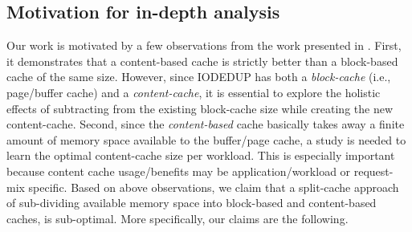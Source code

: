\subsection{Motivation for in-depth analysis}
Our work is motivated by a few observations from the work
presented in \cite{iodedup}.
First, it demonstrates that a content-based cache
is strictly better than a block-based cache of the same size. However, since
IODEDUP has both a \textit{block-cache} (i.e., page/buffer cache)
and a \textit{content-cache}, it is
essential to explore the holistic effects of subtracting from the existing
block-cache size while creating the new content-cache.
Second, since the \textit{content-based} cache
basically takes away a finite amount of memory space available
to the buffer/page cache, a study is needed to learn the
optimal content-cache size per workload. This is especially important
because content cache usage/benefits may be application/workload
or request-mix specific.
Based on above observations, we claim
that a split-cache approach of sub-dividing available
memory space into block-based and content-based caches, is sub-optimal.
More specifically, our claims are the following.
